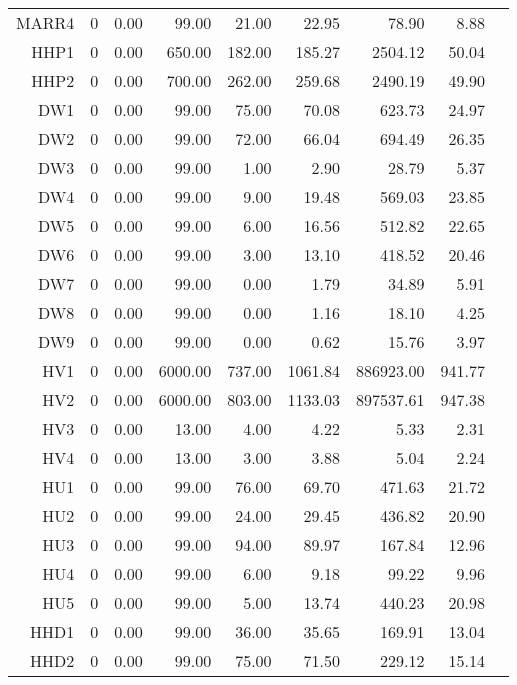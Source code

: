 \begin{longtable}{|rrrrrrrrr|}
	MARR4  &  0  &  0.00  &  99.00  &  21.00  &  22.95  &  78.90  &  8.88 & \\
	HHP1  &  0  &  0.00  &  650.00  &  182.00  &  185.27  &  2504.12  &  50.04 & \\
	HHP2  &  0  &  0.00  &  700.00  &  262.00  &  259.68  &  2490.19  &  49.90 & \\
	DW1  &  0  &  0.00  &  99.00  &  75.00  &  70.08  &  623.73  &  24.97 & \\
	DW2  &  0  &  0.00  &  99.00  &  72.00  &  66.04  &  694.49  &  26.35 & \\
	DW3  &  0  &  0.00  &  99.00  &  1.00  &  2.90  &  28.79  &  5.37 & \\
	DW4  &  0  &  0.00  &  99.00  &  9.00  &  19.48  &  569.03  &  23.85 & \\
	DW5  &  0  &  0.00  &  99.00  &  6.00  &  16.56  &  512.82  &  22.65 & \\
	DW6  &  0  &  0.00  &  99.00  &  3.00  &  13.10  &  418.52  &  20.46 & \\
	DW7  &  0  &  0.00  &  99.00  &  0.00  &  1.79  &  34.89  &  5.91 & \\
	DW8  &  0  &  0.00  &  99.00  &  0.00  &  1.16  &  18.10  &  4.25 & \\
	DW9  &  0  &  0.00  &  99.00  &  0.00  &  0.62  &  15.76  &  3.97 & \\
	HV1  &  0  &  0.00  &  6000.00  &  737.00  &  1061.84  &  886923.00  &  941.77 & \\
	HV2  &  0  &  0.00  &  6000.00  &  803.00  &  1133.03  &  897537.61  &  947.38 & \\
	HV3  &  0  &  0.00  &  13.00  &  4.00  &  4.22  &  5.33  &  2.31 & \\
	HV4  &  0  &  0.00  &  13.00  &  3.00  &  3.88  &  5.04  &  2.24 & \\
	HU1  &  0  &  0.00  &  99.00  &  76.00  &  69.70  &  471.63  &  21.72 & \\
	HU2  &  0  &  0.00  &  99.00  &  24.00  &  29.45  &  436.82  &  20.90 & \\
	HU3  &  0  &  0.00  &  99.00  &  94.00  &  89.97  &  167.84  &  12.96 & \\
	HU4  &  0  &  0.00  &  99.00  &  6.00  &  9.18  &  99.22  &  9.96 & \\
	HU5  &  0  &  0.00  &  99.00  &  5.00  &  13.74  &  440.23  &  20.98 & \\
	HHD1  &  0  &  0.00  &  99.00  &  36.00  &  35.65  &  169.91  &  13.04 & \\
	HHD2  &  0  &  0.00  &  99.00  &  75.00  &  71.50  &  229.12  &  15.14 & \\

\end{longtable}
